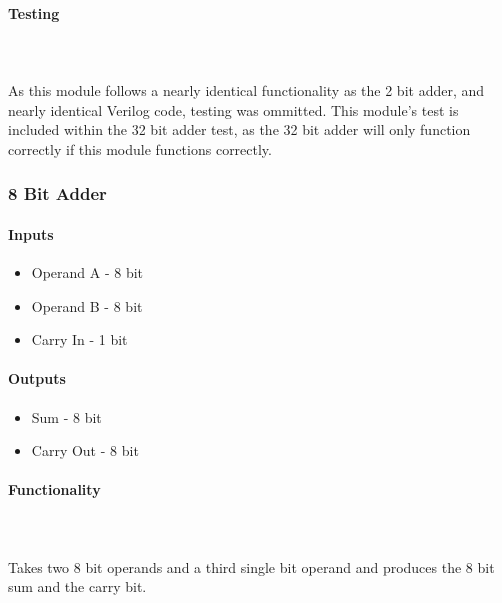\documentclass{article}
\begin{document}
    \paragraph{Testing}
    \hfill\\\\
    As this module follows a nearly identical functionality as the 2
    bit adder, and nearly identical Verilog code, testing was ommitted.
    This module's test is included within the 32 bit adder test, as the
    32 bit adder will only function correctly if this module functions
    correctly.





    \subsubsection{8 Bit Adder}

    \paragraph{Inputs}
    \begin{itemize}
        \item Operand A - 8 bit
        \item Operand B - 8 bit
        \item Carry In - 1 bit
    \end{itemize}

    \paragraph{Outputs}
    \begin{itemize}
        \item Sum - 8 bit
        \item Carry Out - 8 bit
    \end{itemize}

    \paragraph{Functionality}
    \hfill\\\\
    Takes two 8 bit operands and a third single bit operand and produces the
    8 bit sum and the carry bit.
\end{document}
